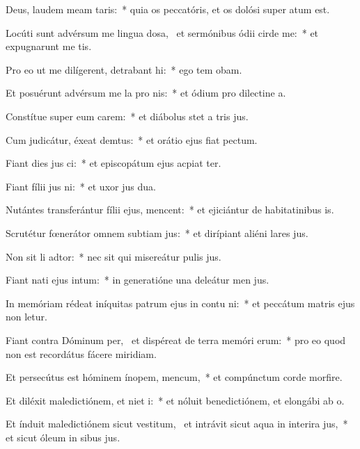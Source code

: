 \item Deus, laudem meam  taris:~* quia os peccatóris, et os dolósi super  atum est.
\item Locúti sunt advérsum me lingua dosa,~\pscross{} et sermónibus ódii cirde me:~* et expugnarunt me tis.
\item Pro eo ut me dilígerent, detrabant hi:~* ego tem obam.
\item Et posuérunt advérsum me la pro nis:~* et ódium pro dilectine a.
\item Constítue super eum carem:~* et diábolus stet a tris jus.
\item Cum judicátur, éxeat demtus:~* et orátio ejus fiat  pectum.
\item Fiant dies jus ci:~* et episcopátum ejus acpiat ter.
\item Fiant fílii jus ni:~* et uxor jus dua.
\item Nutántes transferántur fílii ejus,  mencent:~* et ejiciántur de habitatinibus is.
\item Scrutétur fœnerátor omnem subtiam jus:~* et dirípiant aliéni lares jus.
\item Non sit li adtor:~* nec sit qui misereátur pulis jus.
\item Fiant nati ejus  intum:~* in generatióne una deleátur men jus.
\item In memóriam rédeat iníquitas patrum ejus in contu ni:~* et peccátum matris ejus non letur.
\item Fiant contra Dóminum per,~\pscross{} et dispéreat de terra memóri erum:~* pro eo quod non est recordátus fácere miridiam.
\item Et persecútus est hóminem ínopem,  mencum,~* et compúnctum corde morfire.
\item Et diléxit maledictiónem, et niet i:~* et nóluit benedictiónem, et elongábi ab o.
\item Et índuit maledictiónem sicut vestitum,~\pscross{} et intrávit sicut aqua in interira jus,~* et sicut óleum in sibus jus.
